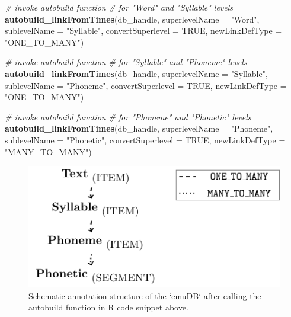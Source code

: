 \documentclass[]{book}
\newenvironment{Shaded}{\begin{snugshade}}{\end{snugshade}}
\newcommand{\CommentTok}[1]{\textcolor[rgb]{0.56,0.35,0.01}{\textit{#1}}}
\newcommand{\DataTypeTok}[1]{\textcolor[rgb]{0.13,0.29,0.53}{#1}}
\newcommand{\KeywordTok}[1]{\textcolor[rgb]{0.13,0.29,0.53}{\textbf{#1}}}
\newcommand{\NormalTok}[1]{#1}
\newcommand{\OtherTok}[1]{\textcolor[rgb]{0.56,0.35,0.01}{#1}}
\newcommand{\StringTok}[1]{\textcolor[rgb]{0.31,0.60,0.02}{#1}}
\theoremstyle{definition}
\theoremstyle{definition}
\theoremstyle{definition}
\theoremstyle{remark}
\begin{document}
\begin{Shaded}
\begin{Highlighting}[]
\CommentTok{# invoke autobuild function}
\CommentTok{# for "Word" and "Syllable" levels}
\KeywordTok{autobuild_linkFromTimes}\NormalTok{(db_handle,}
                        \DataTypeTok{superlevelName =} \StringTok{"Word"}\NormalTok{,}
                        \DataTypeTok{sublevelName =} \StringTok{"Syllable"}\NormalTok{,}
                        \DataTypeTok{convertSuperlevel =} \OtherTok{TRUE}\NormalTok{,}
                        \DataTypeTok{newLinkDefType =} \StringTok{"ONE_TO_MANY"}\NormalTok{)}

\CommentTok{# invoke autobuild function}
\CommentTok{# for "Syllable" and "Phoneme" levels}
\KeywordTok{autobuild_linkFromTimes}\NormalTok{(db_handle,}
                        \DataTypeTok{superlevelName =} \StringTok{"Syllable"}\NormalTok{,}
                        \DataTypeTok{sublevelName =} \StringTok{"Phoneme"}\NormalTok{,}
                        \DataTypeTok{convertSuperlevel =} \OtherTok{TRUE}\NormalTok{,}
                        \DataTypeTok{newLinkDefType =} \StringTok{"ONE_TO_MANY"}\NormalTok{)}

\CommentTok{# invoke autobuild function}
\CommentTok{# for "Phoneme" and "Phonetic" levels}
\KeywordTok{autobuild_linkFromTimes}\NormalTok{(db_handle,}
                        \DataTypeTok{superlevelName =} \StringTok{"Phoneme"}\NormalTok{,}
                        \DataTypeTok{sublevelName =} \StringTok{"Phonetic"}\NormalTok{,}
                        \DataTypeTok{convertSuperlevel =} \OtherTok{TRUE}\NormalTok{,}
                        \DataTypeTok{newLinkDefType =} \StringTok{"MANY_TO_MANY"}\NormalTok{)}
\end{Highlighting}
\end{Shaded}

\begin{figure}

{\centering \includegraphics[width=0.5\linewidth]{pics/tut_simpleAnnotStruct} 

}

\caption{Schematic annotation structure of the `emuDB` after calling the autobuild function in R code snippet above.}\label{fig:tutorial-simpleAnnotStruct}
\end{figure}
\end{document}
